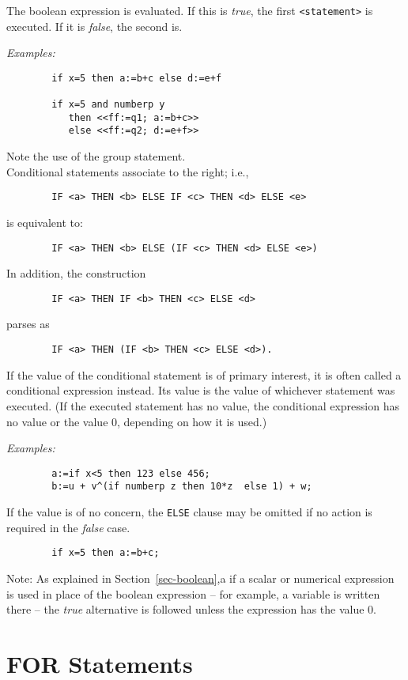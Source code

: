 The boolean expression is evaluated. If this is {\em true}, the first
{\tt <statement>} is executed.  If it is {\em false}, the second is.

{\it Examples:}
\begin{verbatim}
        if x=5 then a:=b+c else d:=e+f

        if x=5 and numberp y
           then <<ff:=q1; a:=b+c>>
           else <<ff:=q2; d:=e+f>>
\end{verbatim}
Note the use of the group statement.
\\
Conditional statements associate to the right; i.e.,
\begin{verbatim}
        IF <a> THEN <b> ELSE IF <c> THEN <d> ELSE <e>
\end{verbatim}
is equivalent to:
\begin{verbatim}
        IF <a> THEN <b> ELSE (IF <c> THEN <d> ELSE <e>)
\end{verbatim}
In addition, the construction
\begin{verbatim}
        IF <a> THEN IF <b> THEN <c> ELSE <d>
\end{verbatim}
parses as
\begin{verbatim}
        IF <a> THEN (IF <b> THEN <c> ELSE <d>).
\end{verbatim}
If the value of the conditional statement is of primary interest, it is often called a conditional
expression instead.  Its value is the value of whichever statement was
executed. (If the executed statement has no value, the conditional
expression has no value or the value 0, depending on how it is used.)

{\it Examples:}
\begin{verbatim}
        a:=if x<5 then 123 else 456;
        b:=u + v^(if numberp z then 10*z  else 1) + w;
\end{verbatim}
If the value is of no concern, the {\tt ELSE} clause may be omitted if no
action is required in the {\em false\/} case.
\begin{verbatim}
        if x=5 then a:=b+c;
\end{verbatim}
Note:  As explained in Section~\ref{sec-boolean},a
if a scalar or numerical expression is used in place of
the boolean expression -- for example, a variable is written there -- the
{\em true\/} alternative is followed unless the expression has the value 0.

\section{FOR Statements}

